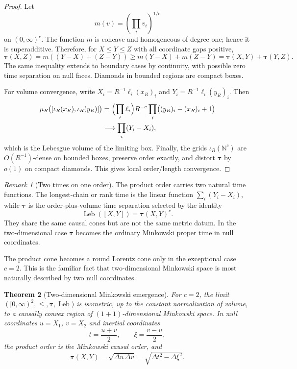 \documentclass[11pt]{article}
\newtheorem{theorem}{Theorem}[section]
\theoremstyle{definition}
\theoremstyle{remark}
\newtheorem{remark}[theorem]{Remark}
\newcommand{\N}{\mathbb{N}}
\newcommand{\Leb}{\operatorname{Leb}}
\newcommand{\taug}{\boldsymbol{\tau}}
\begin{document}
\begin{proof}
Let
\[
  m(v)=\left(\prod_i v_i\right)^{1/c}
\]
on $(0,\infty)^c$.  The function $m$ is concave and homogeneous of degree one; hence it is superadditive.  Therefore, for $X\le Y\le Z$ with all coordinate gaps positive,
\[
  \taug(X,Z)=m((Y-X)+(Z-Y))\ge m(Y-X)+m(Z-Y)
  =\taug(X,Y)+\taug(Y,Z).
\]
The same inequality extends to boundary cases by continuity, with possible zero time separation on null faces.  Diamonds in bounded regions are compact boxes.

For volume convergence, write $X_i=R^{-1}\ell_i(x_R)_i$ and $Y_i=R^{-1}\ell_i(y_R)_i$.  Then
\[
\begin{aligned}
  \mu_R\bigl([\iota_R(x_R),\iota_R(y_R)]\bigr)
  &=\Bigl(\prod_i\ell_i\Bigr)R^{-c}
    \prod_i\bigl((y_R)_i-(x_R)_i+1\bigr) \\
  &\longrightarrow \prod_i(Y_i-X_i),
\end{aligned}
\]
which is the Lebesgue volume of the limiting box.  Finally, the grids $\iota_R(\N^c)$ are $O(R^{-1})$-dense on bounded boxes, preserve order exactly, and distort $\taug$ by $o(1)$ on compact diamonds.  This gives local order/length convergence.
\end{proof}

\begin{remark}[Two times on one order]
\label{rem:two-times}
The product order carries two natural time functions.  The longest-chain or rank time is the linear function $\sum_i(Y_i-X_i)$, while $\taug$ is the order-plus-volume time separation selected by the identity
\[
  \Leb([X,Y])=\taug(X,Y)^c.
\]
They share the same causal cones but are not the same metric datum.  In the two-dimensional case $\taug$ becomes the ordinary Minkowski proper time in null coordinates.
\end{remark}

The product cone becomes a round Lorentz cone only in the exceptional case
$c=2$.  This is the familiar fact that two-dimensional Minkowski space is most
naturally described by two null coordinates.

\begin{theorem}[Two-dimensional Minkowski emergence]
\label{thm:minkowski-2d}
For $c=2$, the limit $([0,\infty)^2,\le,\taug,\Leb)$ is isometric, up to the constant normalization of volume, to a causally convex region of $(1+1)$-dimensional Minkowski space.  In null coordinates $u=X_1$, $v=X_2$ and inertial coordinates
\[
  t=\frac{u+v}{2},\qquad \xi=\frac{v-u}{2},
\]
the product order is the Minkowski causal order, and
\[
  \taug(X,Y)=\sqrt{\Delta u\,\Delta v}
  =\sqrt{\Delta t^2-\Delta\xi^2}.
\]
\end{theorem}
\end{document}
